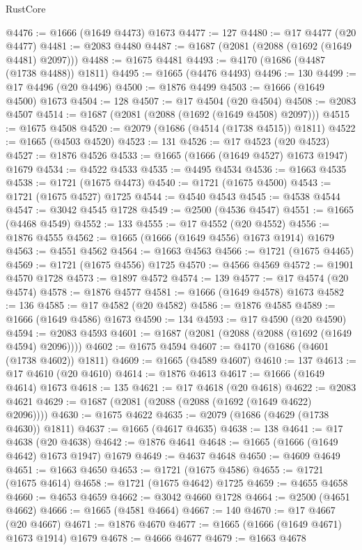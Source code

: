 \begin{lexlean}{RustCore}
\begin{coremodule}
@4476 := @1666 (@1649 @4473) @1673
@4477 := 127
@4480 := @17 @4477 (@20 @4477)
@4481 := @2083 @4480
@4487 := @1687 (@2081 (@2088 (@1692 (@1649 @4481) @2097)))
@4488 := @1675 @4481
@4493 := @4170 (@1686 (@4487 (@1738 @4488)) @1811)
@4495 := @1665 (@4476 @4493)
@4496 := 130
@4499 := @17 @4496 (@20 @4496)
@4500 := @1876 @4499
@4503 := @1666 (@1649 @4500) @1673
@4504 := 128
@4507 := @17 @4504 (@20 @4504)
@4508 := @2083 @4507
@4514 := @1687 (@2081 (@2088 (@1692 (@1649 @4508) @2097)))
@4515 := @1675 @4508
@4520 := @2079 (@1686 (@4514 (@1738 @4515)) @1811)
@4522 := @1665 (@4503 @4520)
@4523 := 131
@4526 := @17 @4523 (@20 @4523)
@4527 := @1876 @4526
@4533 := @1665 (@1666 (@1649 @4527) @1673 @1947) @1679
@4534 := @4522 @4533
@4535 := @4495 @4534
@4536 := @1663 @4535
@4538 := @1721 (@1675 @4473)
@4540 := @1721 (@1675 @4500)
@4543 := @1721 (@1675 @4527) @1725
@4544 := @4540 @4543
@4545 := @4538 @4544
@4547 := @3042 @4545 @1728
@4549 := @2500 (@4536 @4547)
@4551 := @1665 (@4468 @4549)
@4552 := 133
@4555 := @17 @4552 (@20 @4552)
@4556 := @1876 @4555
@4562 := @1665 (@1666 (@1649 @4556) @1673 @1914) @1679
@4563 := @4551 @4562
@4564 := @1663 @4563
@4566 := @1721 (@1675 @4465)
@4569 := @1721 (@1675 @4556) @1725
@4570 := @4566 @4569
@4572 := @1901 @4570 @1728
@4573 := @1897 @4572
@4574 := 139
@4577 := @17 @4574 (@20 @4574)
@4578 := @1876 @4577
@4581 := @1666 (@1649 @4578) @1673
@4582 := 136
@4585 := @17 @4582 (@20 @4582)
@4586 := @1876 @4585
@4589 := @1666 (@1649 @4586) @1673
@4590 := 134
@4593 := @17 @4590 (@20 @4590)
@4594 := @2083 @4593
@4601 := @1687 (@2081 (@2088 (@2088 (@1692 (@1649 @4594) @2096))))
@4602 := @1675 @4594
@4607 := @4170 (@1686 (@4601 (@1738 @4602)) @1811)
@4609 := @1665 (@4589 @4607)
@4610 := 137
@4613 := @17 @4610 (@20 @4610)
@4614 := @1876 @4613
@4617 := @1666 (@1649 @4614) @1673
@4618 := 135
@4621 := @17 @4618 (@20 @4618)
@4622 := @2083 @4621
@4629 := @1687 (@2081 (@2088 (@2088 (@1692 (@1649 @4622) @2096))))
@4630 := @1675 @4622
@4635 := @2079 (@1686 (@4629 (@1738 @4630)) @1811)
@4637 := @1665 (@4617 @4635)
@4638 := 138
@4641 := @17 @4638 (@20 @4638)
@4642 := @1876 @4641
@4648 := @1665 (@1666 (@1649 @4642) @1673 @1947) @1679
@4649 := @4637 @4648
@4650 := @4609 @4649
@4651 := @1663 @4650
@4653 := @1721 (@1675 @4586)
@4655 := @1721 (@1675 @4614)
@4658 := @1721 (@1675 @4642) @1725
@4659 := @4655 @4658
@4660 := @4653 @4659
@4662 := @3042 @4660 @1728
@4664 := @2500 (@4651 @4662)
@4666 := @1665 (@4581 @4664)
@4667 := 140
@4670 := @17 @4667 (@20 @4667)
@4671 := @1876 @4670
@4677 := @1665 (@1666 (@1649 @4671) @1673 @1914) @1679
@4678 := @4666 @4677
@4679 := @1663 @4678

\end{coremodule}
\end{lexlean}
